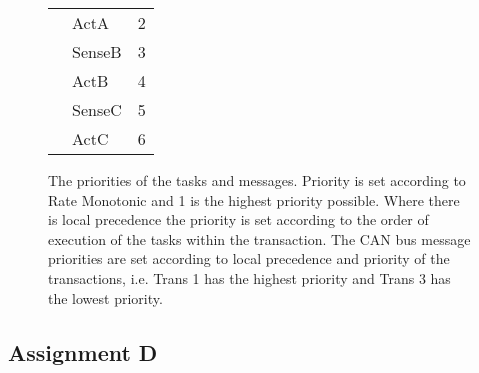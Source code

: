 \begin{figure}[H]
\begin{minipage}{0.5\textwidth}
\begin{table}[H]
\begin{tabular}{|l|l|l|}
                                        & ActA      & 2 \\ 
                                        & SenseB    & 3 \\
                                        & ActB      & 4 \\
                                        & SenseC    & 5 \\
                                        & ActC      & 6 \\ \hline
            \end{tabular}
        \end{table}
    \end{minipage}
    \caption{The priorities of the tasks and messages. Priority is set according to Rate Monotonic and 1 is the highest priority possible. Where there is local precedence the priority is set according to the order of execution of the tasks within the transaction. The CAN bus message priorities are set according to local precedence and priority of the transactions, i.e. Trans 1 has the highest priority and Trans 3 has the lowest priority.}
    \label{fig:priority}
    \end{figure}
    \renewcommand{\arraystretch}{1.0}

    \subsection{Assignment D}

